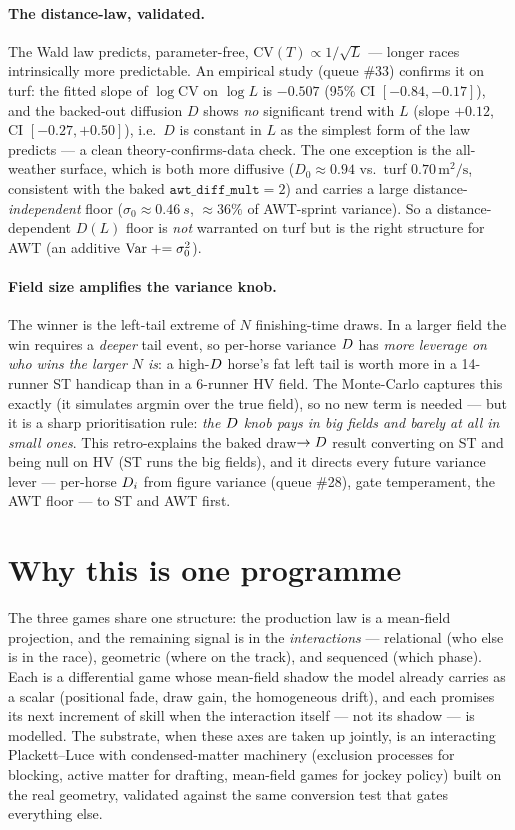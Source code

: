 \paragraph{The distance-law, validated.} The Wald law predicts, parameter-free,
$\mathrm{CV}(T)\propto 1/\sqrt{L}$ --- longer races intrinsically more predictable. An empirical
study (queue \#33) confirms it on turf: the fitted slope of $\log\mathrm{CV}$ on $\log L$ is
$-0.507$ (95\% CI $[-0.84,-0.17]$), and the backed-out diffusion $D$ shows \emph{no} significant
trend with $L$ (slope $+0.12$, CI $[-0.27,+0.50]$), i.e.\ $D$ is constant in $L$ as the simplest
form of the law predicts --- a clean theory-confirms-data check. The one exception is the
all-weather surface, which is both more diffusive ($D_0\approx 0.94$ vs.\ turf $0.70\,\mathrm{m^2/s}$,
consistent with the baked $\texttt{awt\_diff\_mult}=2$) and carries a large distance-\emph{independent}
floor ($\sigma_0\approx\SI{0.46}{s}$, $\approx 36\%$ of AWT-sprint variance). So a distance-dependent
$D(L)$ floor is \emph{not} warranted on turf but is the right structure for AWT (an additive
$\operatorname{Var} \mathrel{+}= \sigma_0^2$).

\paragraph{Field size amplifies the variance knob.} The winner is the left-tail extreme of $N$
finishing-time draws. In a larger field the win requires a \emph{deeper} tail event, so per-horse
variance $D$ has \emph{more leverage on who wins the larger $N$ is}: a high-$D$ horse's
fat left tail is worth more in a 14-runner ST handicap than in a 6-runner HV field. The Monte-Carlo
captures this exactly (it simulates argmin over the true field), so no new term is needed --- but it
is a sharp prioritisation rule: \emph{the $D$ knob pays in big fields and barely at all in
small ones}. This retro-explains the baked draw$\to D$ result converting on ST and being null on
HV (ST runs the big fields), and it directs every future variance lever --- per-horse $D_i$
from figure variance (queue \#28), gate temperament, the AWT floor --- to ST and AWT first.

\section{Why this is one programme}

The three games share one structure: the production law is a mean-field projection, and the
remaining signal is in the \emph{interactions} --- relational (who else is in the race), geometric
(where on the track), and sequenced (which phase). Each is a differential game whose mean-field
shadow the model already carries as a scalar (positional fade, draw gain, the homogeneous drift),
and each promises its next increment of skill when the interaction itself --- not its shadow --- is
modelled. The substrate, when these axes are taken up jointly, is an interacting Plackett--Luce with
condensed-matter machinery (exclusion processes for blocking, active matter for drafting, mean-field
games for jockey policy) built on the real geometry, validated against the same conversion test that
gates everything else.
